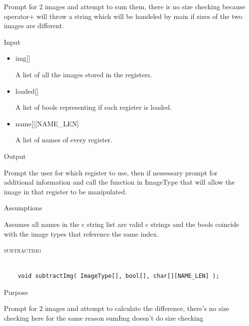 \documentclass[pdftex, 11pt]{article}
\begin{document}
\begin{description}
\begin{description}
				Prompt for 2 images and attempt to sum them, there is no size checking because
				operator+ will throw a string which will be handeled by main if sizes of the
				two images are different.

			\item{Input}

				\begin{itemize}

					\item{img[]}

						A list of all the images stored in the registers.

					\item{loaded[]}

						A list of bools representing if each register is loaded.

					\item{name[][NAME\_LEN]}

						A list of names of every register.

				\end{itemize}

			\item{Output}

				Prompt the user for which register to use, then if nessessary
				prompt for additional information and call the function
				in ImageType that will allow the image in that register to
				be manipulated.

			\item{Assumptions}

				Assumes all names in the c string list are valid c
				strings and the bools coincide with the image types that
				reference the same index.

		\end{description}



	\item{\textsc{subtractimg}}

		\begin{lstlisting}

	void subtractImg( ImageType[], bool[], char[][NAME_LEN] );
		\end{lstlisting}

		\begin{description}
			\item{Purpose}

				Prompt for 2 images and attempt to calculate the difference, there's no size
				checking here for the same reason sumImg doesn't do size checking


\end{description}
\end{description}
\end{document}
